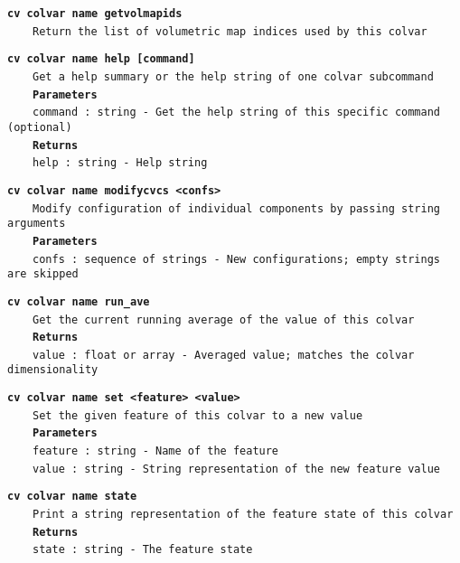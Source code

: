 \begin{mdexampleinput}{}
\texttt{\textbf{cv colvar name getvolmapids}}
\\
\-~~~~\texttt{Return the list of volumetric map indices used by this colvar}
\end{mdexampleinput}
\begin{mdexampleinput}{}
\texttt{\textbf{cv colvar name help [command]}}
\\
\-~~~~\texttt{Get a help summary or the help string of one colvar subcommand}
\\
\-~~~~\texttt{\textbf{Parameters}}
\\
\-~~~~\texttt{command : string - Get the help string of this specific command (optional)}
\\
\-~~~~\texttt{\textbf{Returns}}
\\
\-~~~~\texttt{help : string - Help string}
\end{mdexampleinput}
\begin{mdexampleinput}{}
\texttt{\textbf{cv colvar name modifycvcs <confs>}}
\\
\-~~~~\texttt{Modify configuration of individual components by passing string arguments}
\\
\-~~~~\texttt{\textbf{Parameters}}
\\
\-~~~~\texttt{confs : sequence of strings - New configurations; empty strings are skipped}
\end{mdexampleinput}
\begin{mdexampleinput}{}
\texttt{\textbf{cv colvar name run\_ave}}
\\
\-~~~~\texttt{Get the current running average of the value of this colvar}
\\
\-~~~~\texttt{\textbf{Returns}}
\\
\-~~~~\texttt{value : float or array - Averaged value; matches the colvar dimensionality}
\end{mdexampleinput}
\begin{mdexampleinput}{}
\texttt{\textbf{cv colvar name set <feature> <value>}}
\\
\-~~~~\texttt{Set the given feature of this colvar to a new value}
\\
\-~~~~\texttt{\textbf{Parameters}}
\\
\-~~~~\texttt{feature : string - Name of the feature}
\\
\-~~~~\texttt{value : string - String representation of the new feature value}
\end{mdexampleinput}
\begin{mdexampleinput}{}
\texttt{\textbf{cv colvar name state}}
\\
\-~~~~\texttt{Print a string representation of the feature state of this colvar}
\\
\-~~~~\texttt{\textbf{Returns}}
\\
\-~~~~\texttt{state : string - The feature state}
\end{mdexampleinput}

